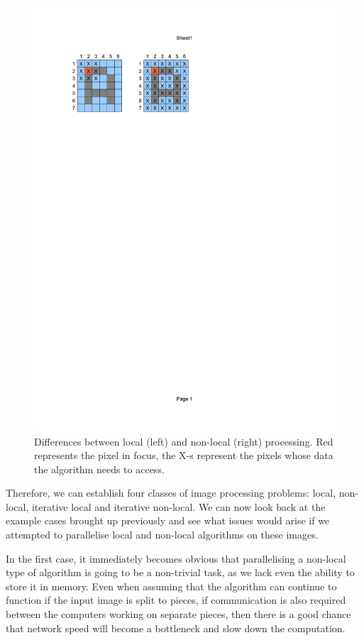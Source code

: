 \documentclass [12pt,a4paper]{report}
\begin{document}
\begin{figure}[h]
\begin{center}
\includegraphics[]{local_nonlocal.pdf}
\caption{Differences between local (left) and non-local (right) processing. Red represents the pixel in focus, the X-s represent the pixels whose data the algorithm needs to access.}
\label{fig_local_nonlocal}
\end{center}
\end{figure}


Therefore, we can establish four classes of image processing problems: local, non-local, iterative local and iterative non-local. We can now look back at the example cases brought up previously and see what issues would arise if we attempted to parallelise local and non-local algorithms on these images.

In the first case, it immediately becomes obvious that parallelising a non-local type of algorithm is going to be a non-trivial task, as we lack even the ability to store it in memory. Even when assuming that the algorithm can continue to function if the input image is split to pieces, if communication is also required between the computers working on separate pieces, then there is a good chance that network speed will become a bottleneck and slow down the computation.
\end{document}
